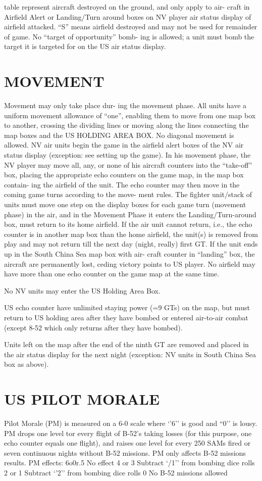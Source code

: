table represent aircraft destroyed on
the ground, and only apply to air-
craft in Airfield Alert or Landing/Turn
around boxes on NV player air status
display of airfield attacked. “S”
means airfield destroyed and may not
be used for remainder of game.
No “target of opportunity” bomb-
ing is allowed; a unit must bomb the
target it is targeted for on the US air
status display.

\section*{MOVEMENT}
Movement may only take place dur-
ing the movement phase. All units
have a uniform movement allowance
of “one”, enabling them to move
from one map box to another, crossing
the dividing lines or moving along the
lines connecting the map boxes and
the US HOLDING AREA BOX. No
diagonal movement is allowed.
NV air units begin the game in the
airfield alert boxes of the NV air
status display (exception: see setting
up the game). In his movement
phase, the NV player may move all,
any, or none of his aircraft counters
into the “take-off” box, placing the
appropriate echo counters on the
game map, in the map box contain-
ing the airfield of the unit. The echo
counter may then move in the coming
game turns according to the move-
ment rules. The fighter unit/stack of
units must move one step on the
display boxes for each game turn
(movement phase) in the air, and in
the Movement Phase it enters the
Landing/Turn-around box, must
return to its home airfield. If the air
unit cannot return, i.e., the echo
counter is in another map box than
the home airfield, the unit(s) is
removed from play and may not
return till the next day (night, really)
first GT. If the unit ends up in the
South China Sea map box with air-
craft counter in “landing” box, the
aircraft are permanently lost, ceding
victory points to US player.
No airfield may have more than one
echo counter on the game map at
the same time.

No NV units may enter the US
Holding Area Box.

US echo counter have unlimited
staying power (=9 GTs) on the map,
but must return to US holding area
after they have bombed or entered
air-to-air combat (except 8-52 which
only returns after they have bombed).

Units left on the map after the end
of the ninth GT are removed and
placed in the air status display for
the next night (exception: NV units in
South China Sea box as above).

\section*{US PILOT MORALE}
Pilot Morale (PM) is measured on a
6-0 scale where ‘’6’’ is good and
“0’’ is lousy. PM drops one level tor
every flight of B-52’s taking losses
(for this purpose, one echo counter
equals one flight), and raises one
level for every 250 SAMs fired or
seven continuous nights without B-52
missions. PM only affects B-52
missions results.
PM effects:
6o0r.5 No effect
4 or 3 Subtract ‘/1’’ from bombing
dice rolls
2 or 1 Subtract ‘’2’’ from bombing
dice rolls
0 No B-52 missions allowed

